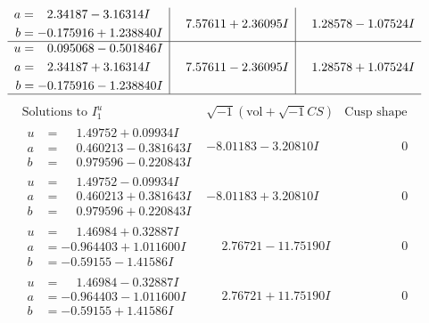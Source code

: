 \documentclass[1p]{elsarticle_modified}
\theoremstyle{definition}
\newcommand{\I}{\sqrt{-1}}
\begin{document}
$$\begin{array}{c|c|c}
\begin{aligned}
a &= \phantom{-}2.34187 - 3.16314 I \\
b &= -0.175916 + 1.238840 I\end{aligned}
 & \phantom{-}7.57611 + 2.36095 I & \phantom{-}1.28578 - 1.07524 I \\ \hline\begin{aligned}
u &= \phantom{-}0.095068 - 0.501846 I \\
a &= \phantom{-}2.34187 + 3.16314 I \\
b &= -0.175916 - 1.238840 I\end{aligned}
 & \phantom{-}7.57611 - 2.36095 I & \phantom{-}1.28578 + 1.07524 I\\
 \hline 
 \end{array}$$\newpage$$\begin{array}{c|c|c}  
\text{Solutions to }I^u_{1}& \I (\text{vol} + \sqrt{-1}CS) & \text{Cusp shape}\\
 \hline 
\begin{aligned}
u &= \phantom{-}1.49752 + 0.09934 I \\
a &= \phantom{-}0.460213 - 0.381643 I \\
b &= \phantom{-}0.979596 - 0.220843 I\end{aligned}
 & -8.01183 - 3.20810 I & \phantom{-0.000000 } 0 \\ \hline\begin{aligned}
u &= \phantom{-}1.49752 - 0.09934 I \\
a &= \phantom{-}0.460213 + 0.381643 I \\
b &= \phantom{-}0.979596 + 0.220843 I\end{aligned}
 & -8.01183 + 3.20810 I & \phantom{-0.000000 } 0 \\ \hline\begin{aligned}
u &= \phantom{-}1.46984 + 0.32887 I \\
a &= -0.964403 + 1.011600 I \\
b &= -0.59155 - 1.41586 I\end{aligned}
 & \phantom{-}2.76721 - 11.75190 I & \phantom{-0.000000 } 0 \\ \hline\begin{aligned}
u &= \phantom{-}1.46984 - 0.32887 I \\
a &= -0.964403 - 1.011600 I \\
b &= -0.59155 + 1.41586 I\end{aligned}
 & \phantom{-}2.76721 + 11.75190 I & \phantom{-0.000000 } 0 \\ \hline\begin{aligned}

\end{aligned}
\end{array}$$
\end{document}
